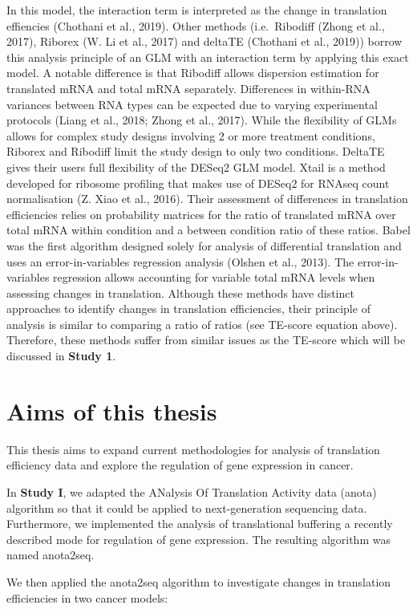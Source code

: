 \documentclass[
  12pt,
  openany]{book}
\begin{document}
In this model, the interaction term is interpreted as the change in translation effiencies (Chothani et al., 2019). Other methods (i.e.~Ribodiff (Zhong et al., 2017), Riborex (W. Li et al., 2017) and deltaTE (Chothani et al., 2019)) borrow this analysis principle of an GLM with an interaction term by applying this exact model. A notable difference is that Ribodiff allows dispersion estimation for translated mRNA and total mRNA separately. Differences in within-RNA variances between RNA types can be expected due to varying experimental protocols (Liang et al., 2018; Zhong et al., 2017). While the flexibility of GLMs allows for complex study designs involving 2 or more treatment conditions, Riborex and Ribodiff limit the study design to only two conditions. DeltaTE gives their users full flexibility of the DESeq2 GLM model. Xtail is a method developed for ribosome profiling that makes use of DESeq2 for RNAseq count normalisation (Z. Xiao et al., 2016). Their assessment of differences in translation efficiencies relies on probability matrices for the ratio of translated mRNA over total mRNA within condition and a between condition ratio of these ratios. Babel was the first algorithm designed solely for analysis of differential translation and uses an error-in-variables regression analysis (Olshen et al., 2013). The error-in-variables regression allows accounting for variable total mRNA levels when assessing changes in translation. Although these methods have distinct approaches to identify changes in translation efficiencies, their principle of analysis is similar to comparing a ratio of ratios (see TE-score equation above). Therefore, these methods suffer from similar issues as the TE-score which will be discussed in \textbf{Study 1}.

\chapter{Aims of this thesis}

This thesis aims to expand current methodologies for analysis of translation efficiency data and explore the regulation of gene expression in cancer.

In \textbf{Study I}, we adapted the ANalysis Of Translation Activity data (anota) algorithm so that it could be applied to next-generation sequencing data. Furthermore, we implemented the analysis of translational buffering a recently described mode for regulation of gene expression. The resulting algorithm was named anota2seq.

We then applied the anota2seq algorithm to investigate changes in translation efficiencies in two cancer models:
\end{document}
